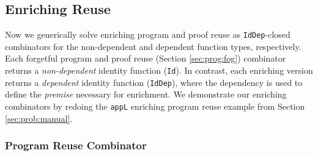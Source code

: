\documentclass[acmsmall]{acmart}\settopmatter{}
\newcommand{\refsec}[1]{Section \ref{sec:#1}}
\newcommand{\labsec}[1]{\label{sec:#1}}
\begin{document}
\subsection{Enriching Reuse}
\labsec{prog:enr}

Now we generically solve
enriching program and proof reuse as \verb;IdDep;-closed
combinators for the non-dependent and dependent function types,
respectively.
Each forgetful program and proof reuse (\refsec{prog:fog})
combinator returns a \textit{non-dependent} identity function (\verb;Id;). In
contrast, each enriching version returns a \textit{dependent}
identity function (\verb;IdDep;), where the dependency is used to
define the \textit{premise} necessary for enrichment.
We demonstrate our enriching combinators by
redoing the \verb;appL; enriching program reuse example from
\refsec{prob:manual}.

\subsubsection{Program Reuse Combinator}
\end{document}
